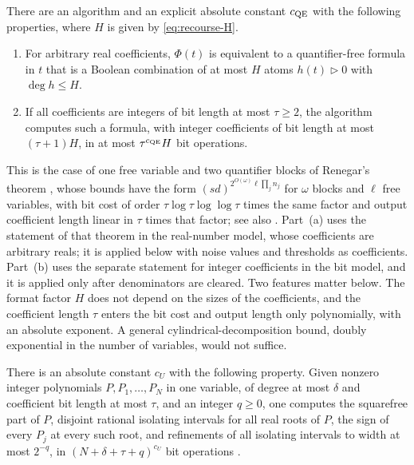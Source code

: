 \begin{theorem}
\label{thm:recourse-qe}
There are an algorithm and an explicit absolute constant $c_{\rm QE}$
with the following properties, where $H$ is given by
\eqref{eq:recourse-H}.
\begin{enumerate}[label=(\alph*)]
\item For arbitrary real coefficients, $\Phi(t)$ is equivalent to a
quantifier-free formula in $t$ that is a Boolean combination of at most
$H$ atoms $h(t)\vartriangleright0$ with $\deg h\le H$.
\item If all coefficients are integers of bit length at most
$\tau\ge2$, the algorithm computes such a formula, with integer
coefficients of bit length at most $(\tau+1)H$, in at most
$\tau^{c_{\rm QE}}H$ bit operations.
\end{enumerate}
\end{theorem}

This is the case of one free variable and two quantifier blocks of
Renegar's theorem \citep[Theorem~1.1]{Renegar1992QE}, whose bounds have
the form $(sd)^{2^{O(\omega)}\ell\prod_jn_j}$ for $\omega$ blocks and
$\ell$ free variables, with bit cost of order
$\tau\log\tau\log\log\tau$ times the same factor and output coefficient
length linear in $\tau$ times that factor; see also
\citet[Chapter~14]{BasuPollackRoy2006}. Part~(a) uses the statement of
that theorem in the real-number model, whose coefficients are arbitrary
reals; it is applied below with noise values and thresholds as
coefficients. Part~(b) uses the separate statement for integer
coefficients in the bit model, and it is applied only after denominators
are cleared. Two features matter below.
The format factor $H$ does not depend on the sizes of the coefficients,
and the coefficient length $\tau$ enters the bit cost and output length
only polynomially, with an absolute exponent. A general
cylindrical-decomposition bound, doubly exponential in the number of
variables, would not suffice.

\begin{theorem}
\label{thm:recourse-univariate}
There is an absolute constant $c_U$ with the following property. Given
nonzero integer polynomials $P,P_1,\ldots,P_N$ in one variable, of
degree at most $\delta$ and coefficient bit length at most $\tau$, and
an integer $q\ge0$, one computes the squarefree part of $P$, disjoint
rational isolating intervals for all real roots of $P$, the sign of
every $P_j$ at every such root, and refinements of all isolating
intervals to width at most $2^{-q}$, in $(N+\delta+\tau+q)^{c_U}$ bit
operations \citep[Chapters~8 and~10]{BasuPollackRoy2006}.
\end{theorem}

